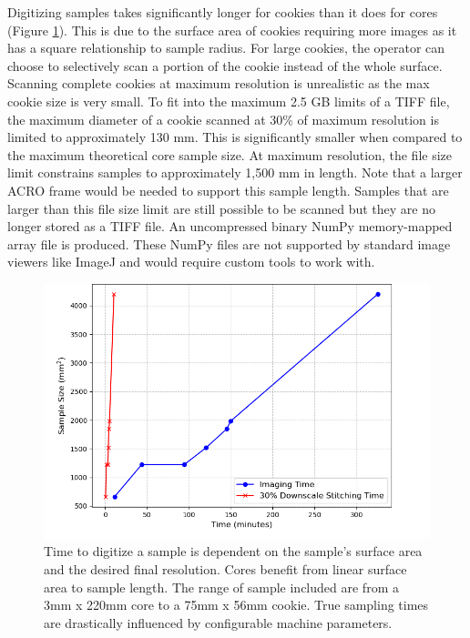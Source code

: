 \documentclass[a4paper,12pt]{article}
\begin{document}
Digitizing samples takes significantly longer for cookies than it does for cores (Figure \ref{fig:digitization_time}). This is due to the surface area of cookies requiring more images as it has a square relationship to sample radius.
For large cookies, the operator can choose to selectively scan a portion of the cookie instead of the whole surface. Scanning complete cookies at maximum resolution is unrealistic as the max cookie size is very small. 
To fit into the maximum 2.5 GB limits of a TIFF file, the maximum diameter of a cookie scanned at 30\% of maximum resolution is limited to approximately 130 mm. This is significantly smaller when compared to the maximum theoretical core sample size. At maximum resolution, the file size limit 
constrains samples to approximately 1,500 mm in length. Note that a larger ACRO frame would be needed to support this sample length. Samples that are larger than this file size limit are still possible to be scanned but they are no longer stored as a TIFF file. 
An uncompressed binary NumPy memory-mapped array file is produced. These NumPy files are not supported by standard image viewers like ImageJ and would require custom tools to work with. 

\begin{figure}
    \centering
    \includegraphics[height=0.5\linewidth]{../../code/plots/time_and_area.png}
    \caption{Time to digitize a sample is dependent on the sample's surface area and the desired final resolution.
    Cores benefit from linear surface area to sample length. The range of sample included are from a 3mm x 220mm core to a 75mm x 56mm cookie. True sampling times are drastically influenced by configurable machine parameters.} %
    \label{fig:digitization_time}
\end{figure}
\end{document}

